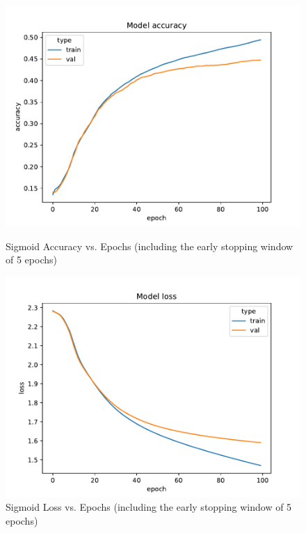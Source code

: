 \documentclass{article}
\begin{document}
    \begin{figure}[H]
        \begin{minipage}[b]{0.5\linewidth}
            \centering
            \includegraphics[width=\textwidth]{../plots/config_2e_Sigmoid_accuracy}
            \caption{Sigmoid Accuracy vs. Epochs (including the early stopping window of 5 epochs)}
            \label{fig:figure13}
        \end{minipage}
        \hspace{0.2cm}
        \begin{minipage}[b]{0.5\linewidth}
            \centering
            \includegraphics[width=\textwidth]{../plots/config_2e_Sigmoid_loss}
            \caption{Sigmoid Loss vs. Epochs (including the early stopping window of 5 epochs)}
            \label{fig:figure14}
        \end{minipage}
    \end{figure}
\end{document}
